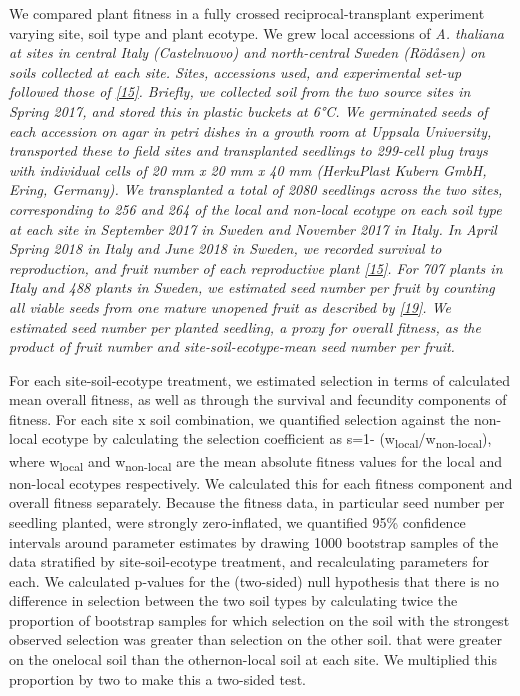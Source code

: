 \documentclass[twocolumn,twoside,lettersize]{article}
\begin{document}
We compared plant fitness in a fully crossed reciprocal-transplant experiment varying site, soil type and plant ecotype. We grew local accessions of  \textit{A. thaliana\textit{ at sites in central Italy (Castelnuovo) and north-central Sweden (Rödåsen) on soils collected at each site. Sites, accessions used, and experimental set-up followed those of  \href{https://paperpile.com/c/ktzZ5s/YZ2m}{[15]}. Briefly, we collected soil from the two source sites in Spring 2017, and stored this in plastic buckets at 6°C. We germinated seeds of each accession on agar in petri dishes in a growth room at Uppsala University, transported these to field sites and transplanted seedlings to 299-cell plug trays with individual cells of 20 mm x 20 mm x 40 mm (HerkuPlast Kubern GmbH, Ering, Germany). We transplanted a total of 2080 seedlings across the two sites, corresponding to 256 and 264 of the local and non-local ecotype on each soil type at each site in September 2017 in Sweden and November 2017 in Italy. In April Spring 2018 in Italy and June 2018 in Sweden, we recorded survival to reproduction, and fruit number of each reproductive plant \href{https://paperpile.com/c/ktzZ5s/YZ2m}{[15]}. For 707 plants in Italy and 488 plants in Sweden, we estimated seed number per fruit by counting all viable seeds from one mature unopened fruit as described by \href{https://paperpile.com/c/ktzZ5s/UCR5}{[19]}. We estimated seed number per planted seedling, a proxy for overall fitness, as the product of fruit number and site-soil-ecotype-mean seed number per fruit.}}

For each site-soil-ecotype treatment, we estimated selection in terms of calculated mean overall fitness, as well as through the survival and fecundity components of fitness. For each site x soil combination, we quantified selection against the non-local ecotype by calculating the selection coefficient as s=1- (w\textsubscript{local}/w\textsubscript{non-local}), where w\textsubscript{local} and w\textsubscript{non-local} are the mean absolute fitness values for the local and non-local ecotypes respectively. We calculated this for each fitness component and overall fitness separately. Because the fitness data, in particular seed number per seedling planted, were strongly zero-inflated, we quantified 95\% confidence intervals around parameter estimates by drawing 1000 bootstrap samples of the data stratified by site-soil-ecotype treatment, and recalculating parameters for each. We calculated p-values for the (two-sided) null hypothesis that there is no difference in selection between the two soil types by calculating twice the proportion of bootstrap samples for which selection on the soil with the strongest observed selection was greater than selection on the other soil. that were greater on the onelocal soil than the othernon-local soil at each site. We multiplied this proportion by two to make this a two-sided test.
\end{document}

